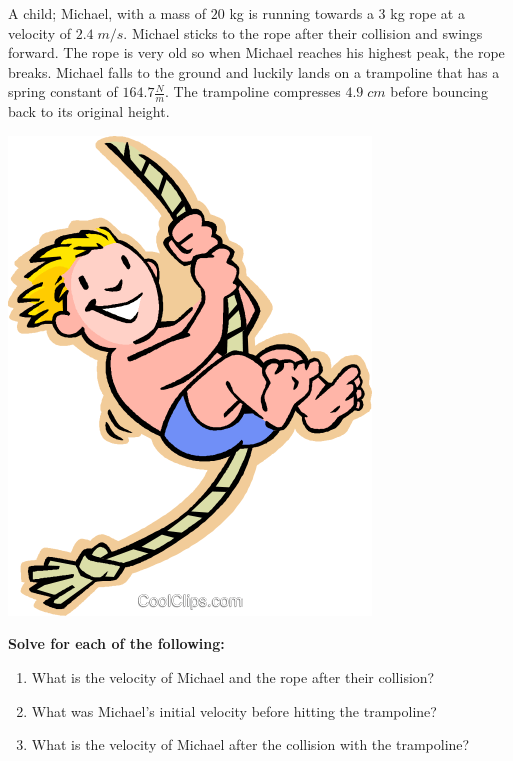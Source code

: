 \documentclass{article}
\begin{document}
\begin{minipage}{0.6\textwidth}
    A child; Michael, with a mass of $20$ kg is running towards a $3$ kg rope at a velocity of $2.4\;m/s$. Michael sticks to the rope
    after their collision and swings forward. The rope is very old so when Michael reaches his highest peak, the rope breaks.
    Michael falls to the ground and luckily lands on a trampoline that has a spring constant of $164.7\frac{N}{m}$.
    The trampoline compresses $4.9\;cm$ before bouncing back to its original height.
\end{minipage}
\hspace{5pt}
\begin{minipage}{0.3\textwidth}
    \includegraphics[scale=0.35]{images/child_rope.png}
\end{minipage}

\vspace{20pt}

\noindent\textbf{Solve for each of the following:}
\begin{enumerate}[label=\alph*)]
    \item What is the velocity of Michael and the rope after their collision?
    \item What was Michael's initial velocity before hitting the trampoline?
    \item What is the velocity of Michael after the collision with the trampoline?
\end{enumerate}\leavevmode
\end{document}
